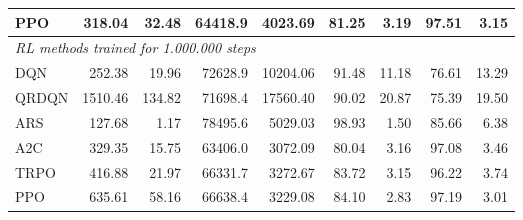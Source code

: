 \begin{samepage}
\begin{center}
\begin{tabular}{l|rr|rr|rr|rr}
    PPO          &   318.04 &    32.48 &    64418.9 &    4023.69 &   81.25 &    3.19 &   97.51 &    3.15 \\
    \midrule
    \multicolumn{9}{l}{\textit{RL methods trained for 1.000.000 steps}} \\
    \midrule
    DQN          &   252.38 &    19.96 &    72628.9 &   10204.06 &   91.48 &   11.18 &   76.61 &   13.29 \\
    QRDQN        &  1510.46 &   134.82 &    71698.4 &   17560.40 &   90.02 &   20.87 &   75.39 &   19.50 \\
    ARS          &   127.68 &     1.17 &    78495.6 &    5029.03 &   98.93 &    1.50 &   85.66 &    6.38 \\
    A2C          &   329.35 &    15.75 &    63406.0 &    3072.09 &   80.04 &    3.16 &   97.08 &    3.46 \\
    TRPO         &   416.88 &    21.97 &    66331.7 &    3272.67 &   83.72 &    3.15 &   96.22 &    3.74 \\
    PPO          &   635.61 &    58.16 &    66638.4 &    3229.08 &   84.10 &    2.83 &   97.19 &    3.01 \\
    \bottomrule
  \end{tabular}
\end{center}
\end{samepage}

